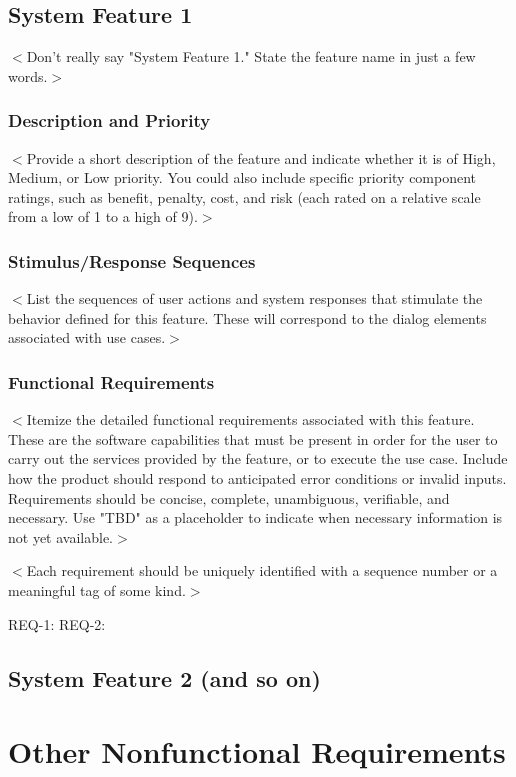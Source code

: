 \documentclass[a4paper, 11pt]{scrreprt}
\begin{document}
\section{System Feature 1}
$<$Don't really say "System Feature 1." State the feature name in just a few 
words.$>$

\subsection{Description and Priority}
$<$Provide a short description of the feature and indicate whether it is of 
High, Medium, or Low priority. You could also include specific priority 
component ratings, such as benefit, penalty, cost, and risk (each rated on a 
relative scale from a low of 1 to a high of 9).$>$

\subsection{Stimulus/Response Sequences}
$<$List the sequences of user actions and system responses that stimulate the 
behavior defined for this feature. These will correspond to the dialog elements 
associated with use cases.$>$

\subsection{Functional Requirements}
$<$Itemize the detailed functional requirements associated with this feature.  
These are the software capabilities that must be present in order for the user 
to carry out the services provided by the feature, or to execute the use case.  
Include how the product should respond to anticipated error conditions or 
invalid inputs. Requirements should be concise, complete, unambiguous, 
verifiable, and necessary. Use "TBD" as a placeholder to indicate when necessary 
information is not yet available.$>$

$<$Each requirement should be uniquely identified with a sequence number or a 
meaningful tag of some kind.$>$

REQ-1:  REQ-2:

\section{System Feature 2 (and so on)}


\chapter{Other Nonfunctional Requirements}
\end{document}
